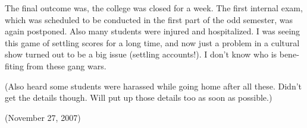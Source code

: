 \begin{english}
The final outcome was, the college was closed for a week. The first internal exam, which was scheduled to be conducted in the first part of the odd semester, was again postponed. Also many students were injured and hospitalized. I was seeing this game of settling scores for a long time, and now just a problem in a cultural show turned out to be a big issue (settling accounts!). I don’t know who is benefiting from these gang wars.

(Also heard some students were harassed while going home after all these. Didn't get the details though. Will put up those details too as soon as possible.)

(November 27, 2007)
\end{english}
\newpage
